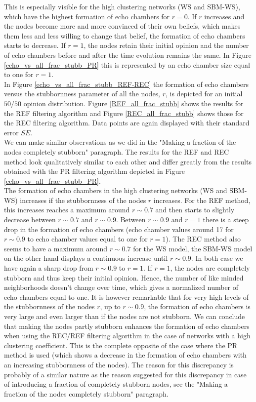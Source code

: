 \documentclass[11 pt , letterpaper , twoside , openright]{book}
\begin{document}
This is especially visible for the high clustering networks (WS and SBM-WS), which have the highest formation of echo chambers for $r=0$. If $r$ increases and the nodes become more and more convinced of their own beliefs, which makes them less and less willing to change that belief, the formation of echo chambers starts to decrease. If $r=1$, the nodes retain their initial opinion and the number of echo chambers before and after the time evolution remains the same. In Figure \ref{echo_vs_all_frac_stubb_PR} this is represented by an echo chamber size equal to one for $r=1$.\\
\newline
In Figure \ref{echo_vs_all_frac_stubb_REF-REC} the formation of echo chambers versus the stubbornness parameter of all the nodes, $r$, is depicted for an initial $50/50$ opinion distribution. Figure \ref{REF_all_frac_stubb} shows the results for the REF filtering algorithm and Figure \ref{REC_all_frac_stubb} shows those for the REC filtering algorithm. Data points are again displayed with their standard error $SE$.\\
We can make similar observations as we did in the "Making a fraction of the nodes completely stubborn" paragraph. The results for the REF and REC method look qualitatively similar to each other and differ greatly from the results obtained with the PR filtering algorithm depicted in Figure \ref{echo_vs_all_frac_stubb_PR}.\\
The formation of echo chambers in the high clustering networks (WS and SBM-WS) increases if the stubbornness of the nodes $r$ increases. For the REF method, this increases reaches a maximum around $r \sim 0.7$ and then starts to slightly decrease between $r\sim 0.7$ and $r\sim 0.9$. Between $r \sim 0.9$ and $r=1$ there is a steep drop in the formation of echo chambers (echo chamber values around 17 for $r\sim 0.9$ to echo chamber values equal to one for $r=1$). The REC method also seems to have a maximum around $r \sim 0.7$ for the WS model, the SBM-WS model on the other hand displays a continuous increase until $r \sim 0.9$. In both case we have again a sharp drop from $r \sim 0.9$ to $r=1$. If $r=1$, the nodes are completely stubborn and thus keep their initial opinion. Hence, the number of like minded neighborhoods doesn't change over time, which gives a normalized number of echo chambers equal to one. It is however remarkable that for very high levels of the stubbornness of the nodes $r$, up to $r \sim 0.9$, the formation of echo chambers is very large and even larger than if the nodes are not stubborn. We can conclude that making the nodes partly stubborn enhances the formation of echo chambers when using the REC/REF filtering algorithm in the case of networks with a high clustering coefficient. This is the complete opposite of the case where the PR method is used (which shows a decrease in the formation of echo chambers with an increasing stubbornness of the nodes). The reason for this discrepancy is probably of a similar nature as the reason suggested for this discrepancy in case of introducing a fraction of completely stubborn nodes, see the "Making a fraction of the nodes completely stubborn" paragraph.\\
\end{document}
